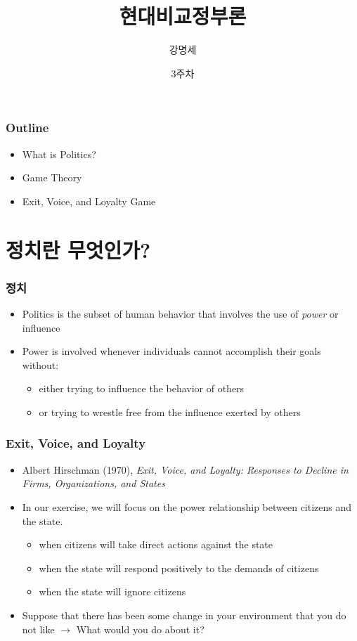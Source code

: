 \documentclass[xcolor=pdftex,dvipsnames]{beamer}
\title[]{현대비교정부론}
\author[]{강명세}
\institute[]{세종연구소}
\date[]{3주차}
\begin{document}
\begin{frame}
\titlepage
\transboxout
\end{frame}


\begin{frame}
\frametitle{Outline}
\begin{itemize}
\item What is Politics?
\item Game Theory
\item Exit, Voice, and Loyalty Game
\end{itemize}
\end{frame}

\section{정치란 무엇인가?}

\begin{frame}
\frametitle{정치}
\begin{itemize}
\item Politics is the subset of human behavior that involves the use of \emph{power} or influence
\item Power is involved whenever individuals cannot accomplish their goals without:
\begin{itemize}
\item either trying to influence the behavior of others
\item or trying to wrestle free from the influence exerted by others
\end{itemize}
\end{itemize}
\end{frame}

\begin{frame}
\frametitle{Exit, Voice, and Loyalty}
\begin{itemize}
\item Albert Hirschman (1970), \emph{Exit, Voice, and Loyalty: Responses to Decline in Firms, Organizations, and States}
\item In our exercise, we will focus on the power relationship between citizens and the state.
\begin{itemize}
\item when citizens will take direct actions against the state
\item when the state will respond positively to the demands of citizens
\item when the state will ignore citizens
\end{itemize}
\item Suppose that there has been some change in your environment that you do not like $\rightarrow$ What would you do about it?
\end{itemize}
\end{frame}
\end{document}
